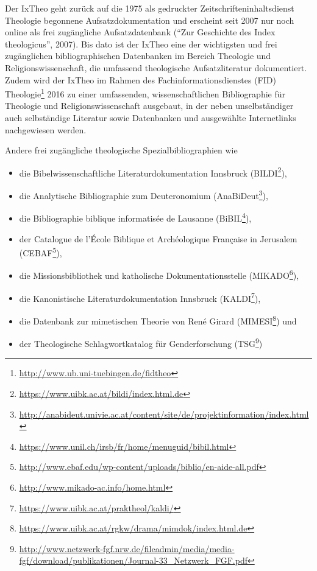 \documentclass[a4paper,
fontsize=11pt,
oneside,
numbers=noperiodatend,
parskip=half-,
bibliography=totoc,
final
]{scrartcl}
\begin{document}
Der IxTheo geht zurück auf die 1975 als gedruckter
Zeitschrifteninhaltsdienst Theologie begonnene Aufsatzdokumentation und
erscheint seit 2007 nur noch online als frei zugängliche
Aufsatzdatenbank (\enquote{Zur Geschichte des Index theologicus}, 2007).
Bis dato ist der IxTheo eine der wichtigsten und frei zugänglichen
bibliographischen Datenbanken im Bereich Theologie und
Religionswissenschaft, die umfassend theologische Aufsatzliteratur
dokumentiert. Zudem wird der IxTheo im Rahmen des
Fachinformationsdienstes (FID) Theologie\footnote{\url{http://www.ub.uni-tuebingen.de/fidtheo}}
2016 zu einer umfassenden, wissenschaftlichen Bibliographie für
Theologie und Religionswissenschaft ausgebaut, in der neben
unselbständiger auch selbständige Literatur sowie Datenbanken und
ausgewählte Internetlinks nachgewiesen werden.

Andere frei zugängliche theologische Spezialbibliographien wie

\begin{itemize}
\item
  die Bibelwissenschaftliche Literaturdokumentation Innsbruck
  (BILDI\footnote{\url{https://www.uibk.ac.at/bildi/index.html.de}}),
\item
  die Analytische Bibliographie zum Deuteronomium (AnaBiDeut\footnote{\url{http://anabideut.univie.ac.at/content/site/de/projektinformation/index.html}}),
\item
  die Bibliographie biblique informatisée de Lausanne (BiBIL\footnote{\url{https://www.unil.ch/irsb/fr/home/menuguid/bibil.html}}),
\item
  der Catalogue de l'École Biblique et Archéologique Française in
  Jerusalem (CEBAF\footnote{\url{http://www.ebaf.edu/wp-content/uploads/biblio/en-aide-all.pdf}}),
\item
  die Missionsbibliothek und katholische Dokumentationsstelle
  (MIKADO\footnote{\url{http://www.mikado-ac.info/home.html}}),
\item
  die Kanonistische Literaturdokumentation Innsbruck (KALDI\footnote{\url{https://www.uibk.ac.at/praktheol/kaldi/}}),
\item
  die Datenbank zur mimetischen Theorie von René Girard
  (MIMESI\footnote{\url{https://www.uibk.ac.at/rgkw/drama/mimdok/index.html.de}})
  und
\item
  der Theologische Schlagwortkatalog für Genderforschung (TSG\footnote{\url{http://www.netzwerk-fgf.nrw.de/fileadmin/media/media-fgf/download/publikationen/Journal-33_Netzwerk_FGF.pdf}})
\end{itemize}
\end{document}
